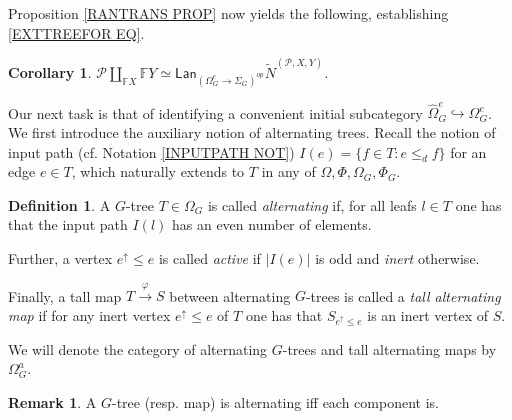 \documentclass[a4paper,10pt
,draft
]{article}%
\numberwithin{equation}{section}
\numberwithin{figure}{section}
\newtheorem{corollary}[equation]{Corollary}%
\theoremstyle{definition} %
\newtheorem{definition}[equation]{Definition}%
\newtheorem{remark}[equation]{Remark}%
\newcommand{\1}{\ensuremath{\mathbbm 1}}%
\begin{document}
Proposition \ref{RANTRANS PROP} now yields the following, establishing \eqref{EXTTREEFOR EQ}.

\begin{corollary}\label{ESTABDESC COR}
	$\mathcal P \coprod\limits_{\mathbb F X} \mathbb F Y \simeq \mathsf{Lan}_{(\Omega_G^e \to \Sigma_G)^{op}}\tilde N^{(\mathcal P, X,Y)}$.
\end{corollary}

Our next task is that of identifying a convenient initial subcategory $\widehat{\Omega}_G^{e} \hookrightarrow \Omega_G^e$.
We first introduce the auxiliary notion of alternating trees.
Recall the notion of input path (cf. Notation \ref{INPUTPATH NOT})
$I(e) = \{f \in T \colon e \leq_d f\}$ for an edge $e \in T$, which naturally extends to $T$ in any of $\Omega, \Phi, \Omega_G, \Phi_G$.


\begin{definition}\label{OMEGAA DEF}
A $G$-tree $T \in \Omega_G$ is called \textit{alternating} if, for all leafs $l \in T$ one has that the input path $I(l)$ has an even number of elements.

Further, a vertex $e^{\uparrow} \leq e$ is called \textit{active}
if $|I(e)|$ is odd and \textit{inert} otherwise.

Finally, a tall map $T \xrightarrow{\varphi} S$ between alternating $G$-trees is called a 
\textit{tall alternating map}
if for any inert vertex $e^{\uparrow} \leq e$ of $T$ one has that 
$S_{e^{\uparrow} \leq e}$ is an inert vertex of $S$.

We will denote the category of alternating $G$-trees and tall alternating maps by $\Omega_G^a$.
\end{definition}

\begin{remark}
	A $G$-tree (resp. map) is alternating
	iff each component is.
\end{remark}
\end{document}
